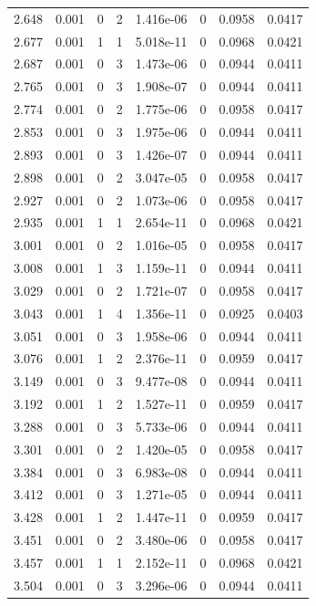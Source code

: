 \documentclass[preview]{standalone}
\begin{document}
{{{\begin{tabular}{L{1.2cm}C{1.2cm} C{0.3cm}C{0.5cm} C{1.4cm}C{1.4cm} C{1.4cm}C{1.4cm}}
  2.648  &  0.001  & 0     &  2 &  1.416e-06  & 0  & 0.0958 &  0.0417   \\ 
  2.677  &  0.001  & 1     &  1 &  5.018e-11  & 0  & 0.0968 &  0.0421   \\ 
  2.687  &  0.001  & 0     &  3 &  1.473e-06  & 0  & 0.0944 &  0.0411   \\ 
  2.765  &  0.001  & 0     &  3 &  1.908e-07  & 0  & 0.0944 &  0.0411   \\ 
  2.774  &  0.001  & 0     &  2 &  1.775e-06  & 0  & 0.0958 &  0.0417   \\ 
  2.853  &  0.001  & 0     &  3 &  1.975e-06  & 0  & 0.0944 &  0.0411   \\ 
  2.893  &  0.001  & 0     &  3 &  1.426e-07  & 0  & 0.0944 &  0.0411   \\ 
  2.898  &  0.001  & 0     &  2 &  3.047e-05  & 0  & 0.0958 &  0.0417   \\ 
  2.927  &  0.001  & 0     &  2 &  1.073e-06  & 0  & 0.0958 &  0.0417   \\ 
  2.935  &  0.001  & 1     &  1 &  2.654e-11  & 0  & 0.0968 &  0.0421   \\ 
  3.001  &  0.001  & 0     &  2 &  1.016e-05  & 0  & 0.0958 &  0.0417   \\ 
  3.008  &  0.001  & 1     &  3 &  1.159e-11  & 0  & 0.0944 &  0.0411   \\ 
  3.029  &  0.001  & 0     &  2 &  1.721e-07  & 0  & 0.0958 &  0.0417   \\ 
  3.043  &  0.001  & 1     &  4 &  1.356e-11  & 0  & 0.0925 &  0.0403   \\ 
  3.051  &  0.001  & 0     &  3 &  1.958e-06  & 0  & 0.0944 &  0.0411   \\ 
  3.076  &  0.001  & 1     &  2 &  2.376e-11  & 0  & 0.0959 &  0.0417   \\ 
  3.149  &  0.001  & 0     &  3 &  9.477e-08  & 0  & 0.0944 &  0.0411   \\ 
  3.192  &  0.001  & 1     &  2 &  1.527e-11  & 0  & 0.0959 &  0.0417   \\ 
  3.288  &  0.001  & 0     &  3 &  5.733e-06  & 0  & 0.0944 &  0.0411   \\ 
  3.301  &  0.001  & 0     &  2 &  1.420e-05  & 0  & 0.0958 &  0.0417   \\ 
  3.384  &  0.001  & 0     &  3 &  6.983e-08  & 0  & 0.0944 &  0.0411   \\ 
  3.412  &  0.001  & 0     &  3 &  1.271e-05  & 0  & 0.0944 &  0.0411   \\ 
  3.428  &  0.001  & 1     &  2 &  1.447e-11  & 0  & 0.0959 &  0.0417   \\ 
  3.451  &  0.001  & 0     &  2 &  3.480e-06  & 0  & 0.0958 &  0.0417   \\ 
  3.457  &  0.001  & 1     &  1 &  2.152e-11  & 0  & 0.0968 &  0.0421   \\ 
  3.504  &  0.001  & 0     &  3 &  3.296e-06  & 0  & 0.0944 &  0.0411   \\ 
\hline 
\end{tabular} 

}}}
\end{document}
